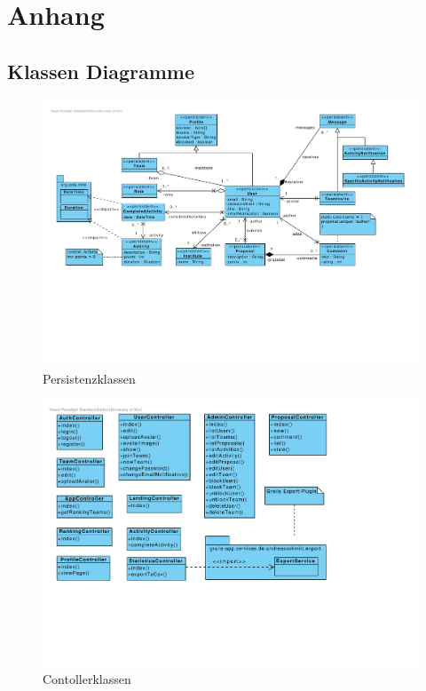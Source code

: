 \section{Anhang}
\subsection{Klassen Diagramme}

\begin{figure}[H]
  \centering
  \includegraphics[width=\textwidth, trim=1cm 1cm 1cm 1cm, clip]{gfx/persistent_classes}
  \caption{Persistenzklassen}
\end{figure}

\begin{figure}[H]
  \centering
  \includegraphics[width=\textwidth, trim=1cm 10cm 11cm 1cm, clip]{gfx/controller_classes}
  \caption{Contollerklassen}
\end{figure}

